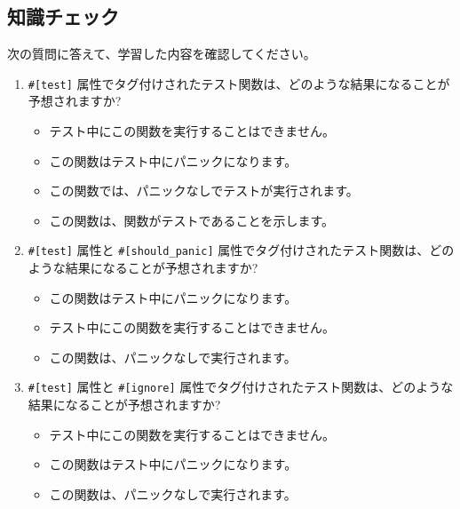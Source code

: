 \subsection{知識チェック}


次の質問に答えて、学習した内容を確認してください。

\begin{enumerate}
\item \texttt{\#[test]} 属性でタグ付けされたテスト関数は、どのような結果になることが予想されますか?
\begin{itemize}
\item テスト中にこの関数を実行することはできません。
\item この関数はテスト中にパニックになります。
\item この関数では、パニックなしでテストが実行されます。
\item この関数は、関数がテストであることを示します。
\end{itemize}
\item \texttt{\#[test]} 属性と \texttt{\#[should\_panic]} 属性でタグ付けされたテスト関数は、どのような結果になることが予想されますか?
\begin{itemize}
\item この関数はテスト中にパニックになります。
\item テスト中にこの関数を実行することはできません。
\item この関数は、パニックなしで実行されます。
\end{itemize}
\item \texttt{\#[test]} 属性と \texttt{\#[ignore]} 属性でタグ付けされたテスト関数は、どのような結果になることが予想されますか?
\begin{itemize}
\item テスト中にこの関数を実行することはできません。
\item この関数はテスト中にパニックになります。
\item この関数は、パニックなしで実行されます。
\end{itemize}
\end{enumerate}